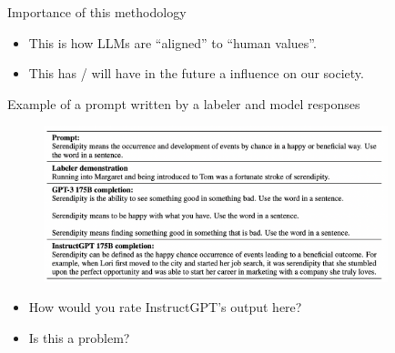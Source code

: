 \begin{vbframe}{Importance of this methodology}




	\begin{itemize}
\item This is how LLMs are ``aligned'' to ``human values''.
\item This has / will have in the future a  influence
on our society.
	\end{itemize}



\end{vbframe}


\begin{vbframe}{Example of a prompt written by a labeler and
model responses}

\vfill

\begin{figure}
\centering
\includegraphics[width = 10cm]{figure/labelerpromptexample.png}
\end{figure}

\begin{itemize}
	\item How would you rate InstructGPT's output here?
        \item Is this a problem?
\end{itemize}


\vfill

\end{vbframe}

